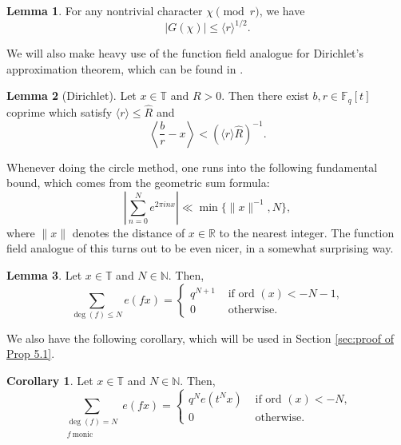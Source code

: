 \documentclass{article}
\theoremstyle{definition}
\newtheorem{cor}{Corollary}[section]
\newtheorem{lem}{Lemma}[section]
\theoremstyle{definition}
\theoremstyle{remark}
\newcommand{\R}{\mathbb{R}}
\newcommand{\F}{\mathbb{F}_q[t]}
\newcommand{\1}{\mathbf{1}}
\numberwithin{equation}{section}
\begin{document}
\begin{lem}\label{lem:Gausssum}
For any nontrivial character $\chi\pmod{r}$, we have
\[|G(\chi)|\le\langle r\rangle^{1/2}.\]
\end{lem}

    

We will also make heavy use of the function field analogue for Dirichlet's approximation theorem, which can be found in \cite{Pollack13}. 
 
\begin{lem}[Dirichlet]
Let $x\in \mathbb{T}$ and $R>0$. Then there exist $b, r\in \F$ coprime which satisfy $\langle r \rangle \leq \widehat{R}$ and
\[\left\langle\frac{b}{r}-x \right\rangle<(\langle r \rangle \widehat{R})^{-1}.\]
\end{lem}




Whenever doing the circle method, one runs into the following fundamental bound, which comes from the geometric sum formula: 
\[\left|\sum_{n=0}^Ne^{2\pi i nx}\right|\ll\min\{\|x\|^{-1},N\},\]
where $\|x\|$ denotes the distance of $x\in\R$ to the nearest integer. The function field analogue of this turns out to be even nicer, in a somewhat surprising way.
\begin{lem}\label{exponentialsumformula} Let $x\in \mathbb{T}$ and $N\in \mathbb{N}$. Then, 
\[\sum_{\deg(f)\leq N }e(fx)=
\begin{cases}
q^{N+1} &\text{ if } \text{ord } (x)  <{-N-1},\\
0&\text{ otherwise}.
\end{cases}
\]
\end{lem}


We also have the following corollary, which will be used in Section \ref{sec:proof of Prop 5.1}. 

\begin{cor}\label{exponentialsumformulaV2} Let $x\in \mathbb{T}$ and $N\in \mathbb{N}$. Then, 
\[\sum_{\substack{\deg(f)=N\\f~\text{monic}} }e(fx)=
\begin{cases}
q^{N}e(t^Nx) &\text{ if } \text{ord } (x)  <{-N},\\
0&\text{ otherwise}.
\end{cases}
\]
\end{cor}
\end{document}
